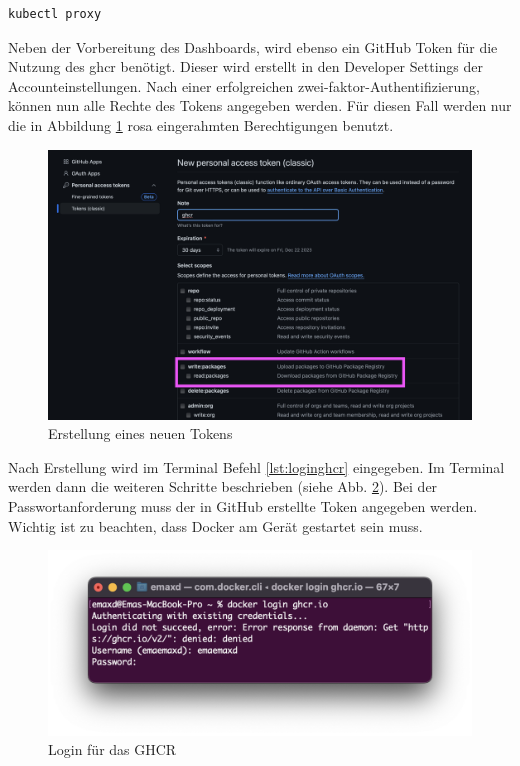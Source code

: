 \begin{lstlisting}[label=lst:kubectlproxy, language=bash, caption=Ausführung des Proxys für Kubernetes]
kubectl proxy
\end{lstlisting}    

Neben der Vorbereitung des Dashboards, wird ebenso ein GitHub Token für die Nutzung des \gls{ghcr} benötigt.
Dieser wird erstellt in den Developer Settings der Accounteinstellungen. 
Nach einer erfolgreichen zwei-faktor-Authentifizierung, können nun alle Rechte des Tokens angegeben werden. 
Für diesen Fall werden nur die in Abbildung \ref{fig:implementation:githubtoken} rosa eingerahmten Berechtigungen benutzt.

\begin{figure}
    \centering
    \includegraphics[scale=0.35]{pics/newtoken.png}
    \caption{Erstellung eines neuen Tokens}
    \label{fig:implementation:githubtoken}
\end{figure}

Nach Erstellung wird im Terminal Befehl \ref{lst:loginghcr} eingegeben. 
Im Terminal werden dann die weiteren Schritte beschrieben (siehe Abb. \ref{fig:implementation:githublogin}). 
Bei der Passwortanforderung muss der in GitHub erstellte Token angegeben werden. 
Wichtig ist zu beachten, dass Docker am Gerät gestartet sein muss. 

\begin{figure}
    \centering
    \includegraphics[scale=0.5]{pics/ghcrloginterminal.png}
    \caption{Login für das GHCR}
    \label{fig:implementation:githublogin}
\end{figure}

